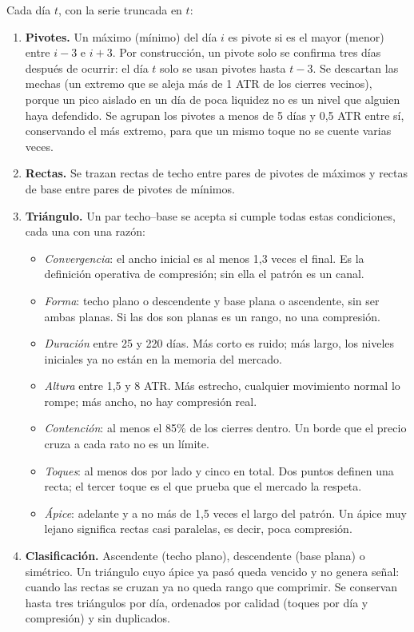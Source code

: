 \documentclass[10pt,a4paper]{article}
\begin{document}
Cada día $t$, con la serie truncada en $t$:
\begin{enumerate}
  \item \textbf{Pivotes.} Un máximo (mínimo) del día $i$ es pivote si es el mayor
        (menor) entre $i-3$ e $i+3$. Por construcción, un pivote solo se confirma
        tres días después de ocurrir: el día $t$ solo se usan pivotes hasta $t-3$.
        Se descartan las mechas (un extremo que se aleja más de 1 ATR de los
        cierres vecinos), porque un pico aislado en un día de poca liquidez no es
        un nivel que alguien haya defendido. Se agrupan los pivotes a menos de 5
        días y 0,5 ATR entre sí, conservando el más extremo, para que un mismo
        toque no se cuente varias veces.
  \item \textbf{Rectas.} Se trazan rectas de techo entre pares de pivotes de
        máximos y rectas de base entre pares de pivotes de mínimos.
  \item \textbf{Triángulo.} Un par techo--base se acepta si cumple todas estas
        condiciones, cada una con una razón:
        \begin{itemize}
          \item \emph{Convergencia}: el ancho inicial es al menos 1,3 veces el
                final. Es la definición operativa de compresión; sin ella el
                patrón es un canal.
          \item \emph{Forma}: techo plano o descendente y base plana o
                ascendente, sin ser ambas planas. Si las dos son planas es un
                rango, no una compresión.
          \item \emph{Duración} entre 25 y 220 días. Más corto es ruido; más
                largo, los niveles iniciales ya no están en la memoria del
                mercado.
          \item \emph{Altura} entre 1,5 y 8 ATR. Más estrecho, cualquier
                movimiento normal lo rompe; más ancho, no hay compresión real.
          \item \emph{Contención}: al menos el 85\% de los cierres dentro. Un
                borde que el precio cruza a cada rato no es un límite.
          \item \emph{Toques}: al menos dos por lado y cinco en total. Dos puntos
                definen una recta; el tercer toque es el que prueba que el mercado
                la respeta.
          \item \emph{Ápice}: adelante y a no más de 1,5 veces el largo del
                patrón. Un ápice muy lejano significa rectas casi paralelas, es
                decir, poca compresión.
        \end{itemize}
  \item \textbf{Clasificación.} Ascendente (techo plano), descendente (base plana)
        o simétrico. Un triángulo cuyo ápice ya pasó queda vencido y no genera
        señal: cuando las rectas se cruzan ya no queda rango que comprimir. Se
        conservan hasta tres triángulos por día, ordenados por calidad (toques
        por día y compresión) y sin duplicados.
\end{enumerate}
\end{document}
